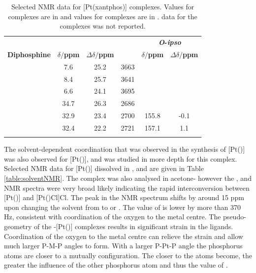\begin{table}[htbp]
\caption[Selected NMR data for [Pt(xantphos)\ce{Cl2}{]} complexes]{Selected NMR data for [Pt(xantphos)] complexes.  Values for \Phxantphos{} complexes are in \cite{Kranenburg1998} and values for \tBuxantphos{} complexes are in .  \carbon{} data for the \Phxantphos{} complexes was not reported.}
\label{table:PtCl2NMR}
\small
\begin{center}
\begin{tabular}{l c c c c c}
\toprule{}
	~~ & \multicolumn{3}{c}{\bfseries{\phosphorus}} & \multicolumn{2}{c}{\bfseries{\carbon{} \emph{O}-\emph{ipso}}}\\
	\cmidrule(lr){2-4} \cmidrule(lr){5-6}
	\bfseries{Diphosphine}&\bfseries{$\delta/$ppm}&\bfseries{$\Delta\delta/$ppm}&\bfseries{\JPtP}&\bfseries{$\delta/$ppm}&\bfseries{$\Delta\delta/$ppm}\\
	\midrule{}
	\PhSixantphos		& 7.6	   & 25.2 & 3663 & &\\
	\PhThixantphos		& 8.4   & 25.7 & 3641 &&\\
	\PhXantphos		& 6.6	   & 24.1 & 3695 & &\\
	\tBuSixantphos 		& 34.7 & 26.3 & 2686 &&\\
	\tBuThixantphos 	& 32.9 & 23.4 & 2700 & 155.8 & -0.1\\
	\tBuXantphos		& 32.4 & 22.2 & 2721 & 157.1 & 1.1\\
	\bottomrule{}
\end{tabular}
\end{center}
\end{table}

The solvent-dependent coordination that was observed in the synthesis of [Pt(\tButhixantphos)] was also observed for [Pt(\tBuxantphos)], and was studied in more depth for this complex.  Selected NMR data for [Pt(\tBuxantphos)] dissolved in ,  and  are given in Table \ref{table:solventNMR}.  The complex was also analysed in acetone- however the \proton{}, \carbon{} and \phosphorus{} NMR spectra were very broad likely indicating the rapid interconversion between [Pt(\tBuxantphos)] and [Pt(\tBuxantphosk)Cl]Cl.  The peak in the \phosphorus{} NMR spectrum shifts by around 15 ppm upon changing the solvent from  to  or .  The value of \JPtP{} is lower by more than 370 Hz, consistent with coordination of the oxygen to the metal centre.  The pseudo-\trans{} geometry of the \trans-[Pt(\tBuxantphos)] complexes results in significant strain in the \tBuxantphos{} ligands.  Coordination of the oxygen to the metal centre can relieve the strain and allow much larger P-M-P angles to form.  With a larger P-Pt-P angle the phosphorus atoms are closer to a mutually \trans{} configuration.  The closer to \trans{} the atoms become, the greater the influence of the other phosphorus atom and thus the value of \JPtP{}.  

